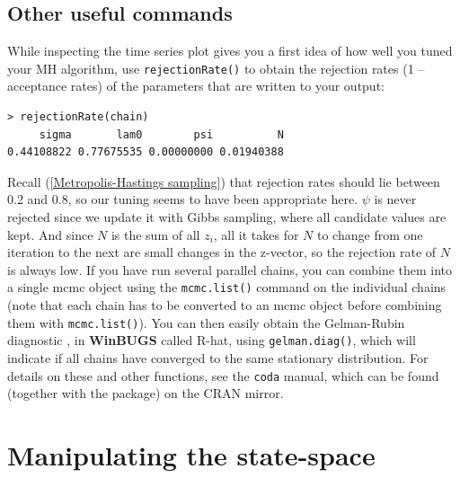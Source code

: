 \subsection{Other useful commands }
While inspecting the time series plot gives you a first idea of how well you tuned your MH algorithm, use \verb#rejectionRate()# to obtain the rejection rates (1 -- acceptance rates) of the parameters that are written to your output:
\begin{verbatim}
> rejectionRate(chain)
     sigma       lam0        psi          N
0.44108822 0.77675535 0.00000000 0.01940388
\end{verbatim}
 Recall (\ref{Metropolis-Hastings sampling}) that rejection rates should lie between 0.2 and 0.8, so our tuning seems to have been appropriate here. $\psi$ is never rejected since we update it with Gibbs sampling, where all candidate values are kept. And since $N$ is the sum of all $z_i$, all it takes for $N$ to change from one iteration to the next are small changes in the z-vector, so the rejection rate of $N$ is always low.
If you have run several parallel chains, you can combine them into a single mcmc object using the \verb#mcmc.list()# command on the individual chains (note that each chain has to be converted to an mcmc object before combining them with \verb#mcmc.list()#). You can then easily obtain the Gelman-Rubin diagnostic \citep{gelman_etal:2004}, in {\bf WinBUGS} called R-hat, using \verb#gelman.diag()#, which 
will indicate if all chains have converged to the same stationary distribution.
For details on these and other functions, see the \mbox{\tt coda} manual, 
which can be found (together with the package) on the CRAN mirror.

\section{Manipulating the state-space}

